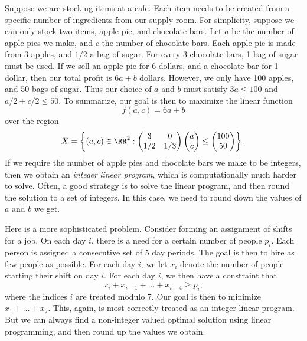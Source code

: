 \begin{example}
    Suppose we are stocking items at a cafe. Each item needs to be created from a specific number of ingredients from our supply room. For simplicity, suppose we can only stock two items, apple pie, and chocolate bars. Let $a$ be the number of apple pies we make, and $c$ the number of chocolate bars. Each apple pie is made from 3 apples, and $1/2$ a bag of sugar. For every 3 chocolate bars, 1 bag of sugar must be used. If we sell an apple pie for 6 dollars, and a chocolate bar for 1 dollar, then our total profit is $6a + b$ dollars. However, we only have 100 apples, and 50 bags of sugar. Thus our choice of $a$ and $b$ must satisfy $3a \leq 100$ and $a/2 + c/2 \leq 50$. To summarize, our goal is then to maximize the linear function
    \[ f(a,c) = 6a + b \]
    over the region
    \[ X = \left\{ (a,c) \in \RR^2: \begin{pmatrix} 3 & 0 \\ 1/2 & 1/3 \end{pmatrix} \begin{pmatrix} a \\ c \end{pmatrix} \leq \begin{pmatrix} 100 \\ 50 \end{pmatrix} \right\}. \]
    If we require the number of apple pies and chocolate bars we make to be integers, then we obtain an \emph{integer linear program}, which is computationally much harder to solve. Often, a good strategy is to solve the linear program, and then round the solution to a set of integers. In this case, we need to round down the values of $a$ and $b$ we get.
\end{example}

\begin{example}
    Here is a more sophisticated problem. Consider forming an assignment of shifts for a job. On each day $i$, there is a need for a certain number of people $p_i$. Each person is assigned a consecutive set of 5 day periods. The goal is then to hire as few people as possible. For each day $i$, we let $x_i$ denote the number of people starting their shift on day $i$. For each day $i$, we then have a constraint that
    \[ x_i + x_{i-1} + \dots + x_{i-4} \geq p_i, \]
    where the indices $i$ are treated modulo 7. Our goal is then to minimize $x_1 + \dots + x_7$. This, again, is most correctly treated as an integer linear program. But we can always find a non-integer valued optimal solution using linear programming, and then round up the values we obtain.
\end{example}

